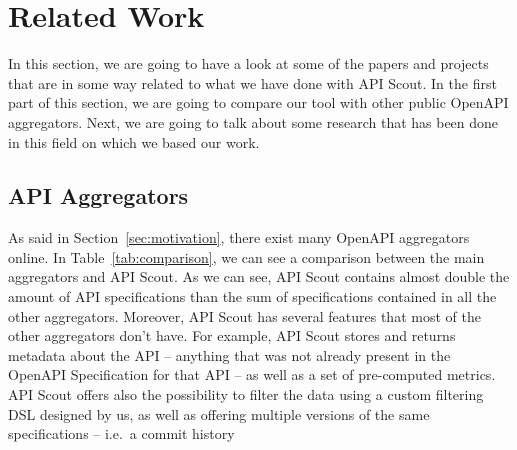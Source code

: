 \section{Related Work}\label{sec:related-work}
In this section, we are going to have a look at some of the papers and projects that are in some way related to what we have done with API Scout.
In the first part of this section, we are going to compare our tool with other public OpenAPI aggregators.
Next, we are going to talk about some research that has been done in this field on which we based our work.

\subsection{API Aggregators}\label{subsec:api-aggregators}
As said in Section~\ref{sec:motivation}, there exist many OpenAPI aggregators online.
In Table~\ref{tab:comparison}, we can see a comparison between the main aggregators and API Scout.
As we can see, API Scout contains almost double the amount of API specifications than the sum of specifications contained in all the other aggregators.
Moreover, API Scout has several features that most of the other aggregators don't have.
For example, API Scout stores and returns metadata about the API -- anything that was not already present in the OpenAPI Specification for that API -- as well as a set of pre-computed metrics.
API Scout offers also the possibility to filter the data using a custom filtering DSL designed by us, as well as offering multiple versions of the same specifications -- i.e.\ a commit history

